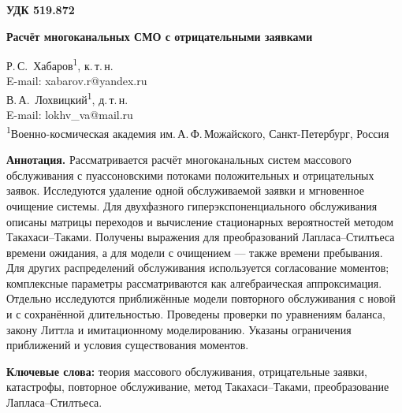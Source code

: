 

\noindent\textbf{УДК 519.872}
\vspace{1em}

\begin{center}
{\Large\bfseries Расчёт многоканальных СМО с отрицательными заявками}
\end{center}
\vspace{0.8em}

\begin{center}
Р.\,С.~Хабаров\textsuperscript{1}, к.\,т.\,н.\\[2pt]
E-mail: xabarov.r@yandex.ru\\[6pt]
В.\,А.~Лохвицкий\textsuperscript{1}, д.\,т.\,н.\\[2pt]
E-mail: lokhv\_va@mail.ru\\[8pt]
{\small\textsuperscript{1}Военно-космическая академия им.\,А.\,Ф.\,Можайского, Санкт-Петербург, Россия}
\end{center}
\vspace{0.5em}

\noindent\textbf{Аннотация.} 
Рассматривается расчёт многоканальных систем массового обслуживания с пуассоновскими потоками положительных и отрицательных заявок. Исследуются удаление одной обслуживаемой заявки и мгновенное очищение системы. Для двухфазного гиперэкспоненциального обслуживания описаны матрицы переходов и вычисление стационарных вероятностей методом Такахаси--Таками. Получены выражения для преобразований Лапласа--Стилтьеса времени ожидания, а для модели с очищением --- также времени пребывания. Для других распределений обслуживания используется согласование моментов; комплексные параметры рассматриваются как алгебраическая аппроксимация. Отдельно исследуются приближённые модели повторного обслуживания с новой и с сохранённой длительностью. Проведены проверки по уравнениям баланса, закону Литтла и имитационному моделированию. Указаны ограничения приближений и условия существования моментов.

\textbf{Ключевые слова:} теория массового обслуживания, отрицательные заявки, катастрофы, повторное обслуживание, метод Такахаси--Таками, преобразование Лапласа--Стилтьеса.

